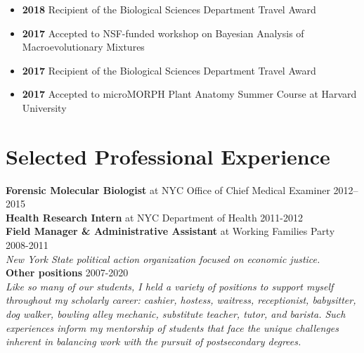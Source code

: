 \documentclass[]{article}
\begin{document}
\begin{itemize}[label=$\mathwitch*$]
\item{\textbf{2018} Recipient of the Biological Sciences Department Travel Award}
\item{\textbf{2017} Accepted to NSF-funded workshop on Bayesian Analysis of Macroevolutionary Mixtures \href{http://bamm-project.org/index.html}{\faLink}}
\item{\textbf{2017} Recipient of the Biological Sciences Department Travel Award}
\item{\textbf{2017} Accepted to microMORPH Plant Anatomy Summer Course at Harvard University \href{https://web.archive.org/web/20170922060558/http://arboretum.harvard.edu/tracing-evolution-form-function/}{\faLink}}
\end{itemize}
\vspace{2mm}

\section{\fontsize{16}{48}\selectfont Selected Professional Experience}

\textbf{Forensic Molecular Biologist} at NYC Office of Chief Medical Examiner \hfill 2012--2015\\
   
\textbf{Health Research Intern} at NYC Department of Health \hfill 2011-2012\\
     
\textbf{Field Manager \& Administrative Assistant} at Working Families Party \hfill 2008-2011\\
\textit{New York State political action organization focused on economic justice.}\\

\textbf{Other positions} \hfill 2007-2020\\
\textit{Like so many of our students, I held a variety of positions to support myself throughout my scholarly career: cashier, hostess, waitress, receptionist, babysitter, dog walker, bowling alley mechanic, substitute teacher, tutor, and barista. Such experiences inform my mentorship of students that face the unique challenges inherent in balancing work with the pursuit of postsecondary degrees.}

\vspace{3mm}
\end{document}
